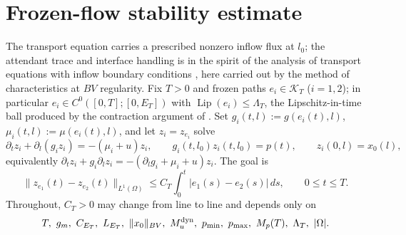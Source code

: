 \documentclass[a4paper,fleqn,longmktitle]{cas-sc}
\theoremstyle{plain}
\theoremstyle{definition}
\theoremstyle{remark}
\numberwithin{equation}{section}
\begin{document}



\appendix
\section{Frozen-flow stability estimate}
\label{app:frozen_flow_stability}
The transport equation carries a prescribed nonzero inflow flux at \(l_0\); the
attendant trace and interface handling is in the spirit of the analysis of
transport equations with inflow boundary conditions \cite{scott2022transport}, here
carried out by the method of characteristics at \(BV\) regularity.
Fix \(T>0\) and frozen paths \(e_i\in\mathcal K_T\) (\(i=1,2\)); in particular
\(e_i\in C^0([0,T];[0,E_T])\) with \(\operatorname{Lip}(e_i)\le\Lambda_T\), the
Lipschitz-in-time ball produced by the contraction argument of
. Set \(g_i(t,l):=g(e_i(t),l)\),
\(\mu_i(t,l):=\mu(e_i(t),l)\), and let \(z_i=z_{e_i}\) solve
\[
    \partial_t z_i+\partial_l(g_i z_i)=-(\mu_i+u)z_i,
    \qquad
    g_i(t,l_0)z_i(t,l_0)=p(t),
    \qquad
    z_i(0,l)=x_0(l),
\]
equivalently \(\partial_t z_i+g_i\partial_lz_i=-(\partial_lg_i+\mu_i+u)z_i\).
The goal is
\begin{equation}
    \label{eq:app_goal}
    \|z_{e_1}(t)-z_{e_2}(t)\|_{L^1(\Omega)}
    \le
    C_T\int_0^t |e_1(s)-e_2(s)|\,ds,
    \qquad
    0\le t\le T .
\end{equation}
Throughout, \(C_T>0\) may change from line to line and depends only on
\[
    T,\ g_m,\ C_{E_T},\ L_{E_T},\ \|x_0\|_{BV},\ M_u^{\rm dyn},\
    p_{\min},\ p_{\max},\ M_p(T),\ \Lambda_T,\ |\Omega|.
\]
\end{document}
